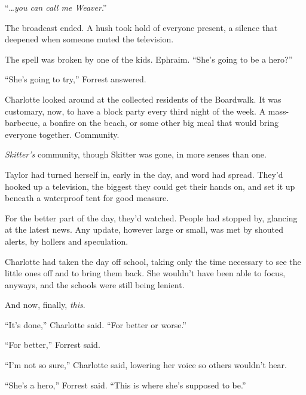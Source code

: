 ``\ldots\emph{you can call me Weaver}.''



The broadcast ended.   A hush took hold of everyone present, a silence that deepened when someone muted the television.



The spell was broken by one of the kids.  Ephraim.  ``She's going to be a hero?''



``She's going to try,'' Forrest answered.



Charlotte looked around at the collected residents of the Boardwalk.  It was customary, now, to have a block party every third night of the week.  A mass-barbecue, a bonfire on the beach, or some other big meal that would bring everyone together.  Community.



\emph{Skitter's} community, though Skitter was gone, in more senses than one.



Taylor had turned herself in, early in the day, and word had spread.  They'd hooked up a television, the biggest they could get their hands on, and set it up beneath a waterproof tent for good measure.



For the better part of the day, they'd watched.  People had stopped by, glancing at the latest news.  Any update, however large or small, was met by shouted alerts, by hollers and speculation.



Charlotte had taken the day off school, taking only the time necessary to see the little ones off and to bring them back.  She wouldn't have been able to focus, anyways, and the schools were still being lenient.



And now, finally, \emph{this}.



``It's done,'' Charlotte said.  ``For better or worse.''



``For better,'' Forrest said.



``I'm not so sure,'' Charlotte said, lowering her voice so others wouldn't hear.



``She's a hero,'' Forrest said.  ``This is where she's supposed to be.''



